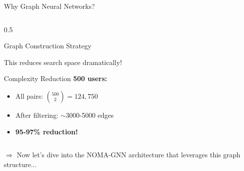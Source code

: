 \documentclass[aspectratio=169]{beamer}
\begin{document}
\begin{frame}{Why Graph Neural Networks?}
\begin{columns}
\begin{column}{0.5\textwidth}
\begin{block}{Graph Construction Strategy}
                \vspace{0.1cm}
                
                This reduces search space dramatically!
            \end{block}
            
            \vspace{0.2cm}
            
            \begin{exampleblock}{Complexity Reduction}
                \textbf{500 users:}
                \begin{itemize}
                    \item All pairs: $\binom{500}{2} = 124,750$
                    \item After filtering: $\sim$3000-5000 edges
                    \item \textbf{95-97\% reduction!}
                \end{itemize}
            \end{exampleblock}
        \end{column}
    \end{columns}
    
    \vspace{0.1cm}
    \small \textcolor{iiitblue}{$\Rightarrow$ Now let's dive into the NOMA-GNN architecture that leverages this graph structure...}
\end{frame}
\end{document}
